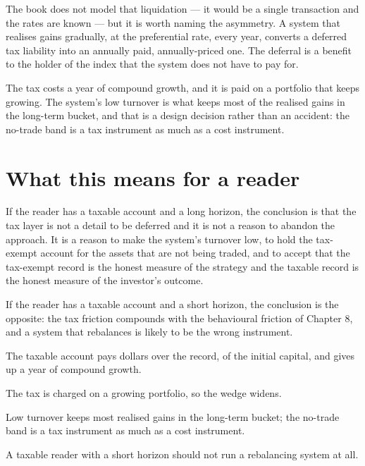 The book does not model that liquidation --- it would be a single
transaction and the rates are known --- but it is worth naming the
asymmetry. A system that realises gains gradually, at the preferential
rate, every year, converts a deferred tax liability into an annually
paid, annually-priced one. The deferral is a benefit to the holder of the
index that the system does not have to pay for.

\begin{takeaway}
The tax costs \numTaxPenalty{} a year of compound growth, and it is paid
on a portfolio that keeps growing. The system's low turnover is what
keeps most of the realised gains in the long-term bucket, and that is a
design decision rather than an accident: the no-trade band is a tax
instrument as much as a cost instrument.
\end{takeaway}

\section{What this means for a reader}

If the reader has a taxable account and a long horizon, the conclusion is
that the tax layer is not a detail to be deferred and it is not a reason
to abandon the approach. It is a reason to make the system's turnover low,
to hold the tax-exempt account for the assets that are not being traded,
and to accept that the tax-exempt record is the honest measure of the
strategy and the taxable record is the honest measure of the investor's
outcome.

If the reader has a taxable account and a short horizon, the conclusion
is the opposite: the tax friction compounds with the behavioural friction
of Chapter 8, and a system that rebalances is likely to be the wrong
instrument.

\begin{keytakeaways}
\item The taxable account pays \numTaxTotal{} dollars over the record,
\numTaxFraction{} of the initial capital, and gives up \numTaxPenalty{} a
year of compound growth.
\item The tax is charged on a growing portfolio, so the wedge widens.
\item Low turnover keeps most realised gains in the long-term bucket; the
no-trade band is a tax instrument as much as a cost instrument.
\item A taxable reader with a short horizon should not run a rebalancing
system at all.
\end{keytakeaways}
